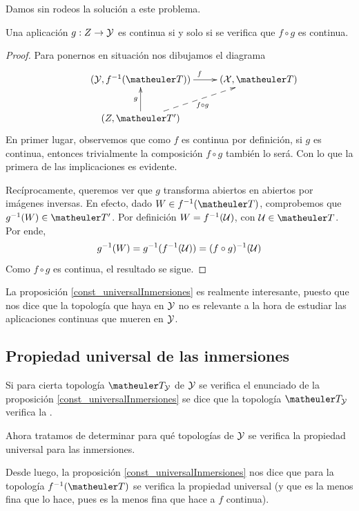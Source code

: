 Damos sin rodeos la solución a este problema.
\begin{prop}
	\label{const_universalInmersiones}
	Una aplicación $g:Z\to\mathcal{Y}$ es continua si y solo si se verifica que $f\circ g$ es continua.
\end{prop}
\begin{proof}
	Para ponernos en situación nos dibujamos el diagrama
	\begin{equation*}
	\xymatrix{
		&(\Y,f^{-1}(\T)) \ar[r]^f
		&(\X,\T) \\
		&(Z,\T') \ar@{-->}[ru]_{f\circ g} \ar[u]^g}
	\end{equation*}
	En primer lugar, observemos que como $f$ es continua por definición, si $g$ es continua, entonces trivialmente la composición $f\circ g$ también lo será. Con lo que la primera de las implicaciones es evidente.
	
	Recíprocamente, queremos ver que $g$ transforma abiertos en abiertos por imágenes inversas. En efecto, dado $W\in f^{-1}(\T)$, comprobemos que $g^{-1}(W)\in\T'$. Por definición $W=f^{-1}(\mathcal{U})$, con $\U\in\T$. Por ende,
	\begin{equation*}
		g^{-1}(W)=g^{-1}(f^{-1}(\mathcal{U}))=(f\circ g)^{-1}(\mathcal{U})
	\end{equation*}
	Como $f\circ g$ es continua, el resultado se sigue.
\end{proof}
\begin{obs}
	La proposición \ref{const_universalInmersiones} es realmente interesante, puesto que nos dice que la topología que haya en $\mathcal{Y}$ no es relevante a la hora de estudiar las aplicaciones continuas que mueren en $\mathcal{Y}$.
\end{obs}
\subsection{Propiedad universal de las inmersiones}
\begin{defi}
	Si para cierta topología $\T_\Y$ de $\mathcal{Y}$ se verifica el enunciado de la proposición \ref{const_universalInmersiones} se dice que la topología $\T_\Y$ verifica la .
\end{defi}
Ahora tratamos de determinar para qué topologías de $\mathcal{Y}$ se verifica la propiedad universal para las inmersiones.

Desde luego, la proposición \ref{const_universalInmersiones} nos dice que para la topología $f^{-1}(\T)$ se verifica la propiedad universal (y que es la menos fina que lo hace, pues es la menos fina que hace a $f$ continua).

